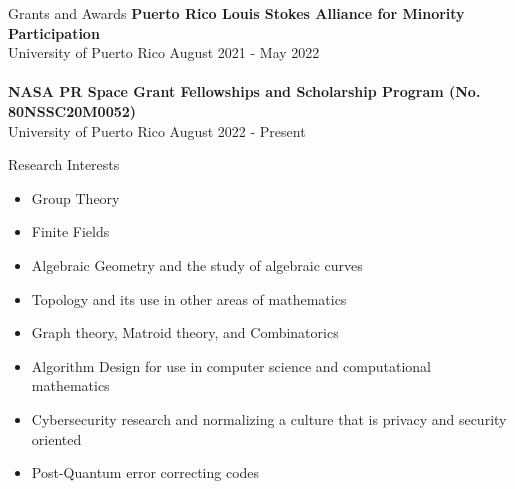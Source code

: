 \documentclass{resume} %
\begin{document}
\begin{rSection}{Grants and Awards}
    \textbf{Puerto Rico Louis Stokes Alliance for Minority Participation} \\
    University of Puerto Rico \hfill{August 2021 - May 2022} \\\\
    \textbf{NASA PR Space Grant Fellowships and Scholarship Program (No.
    80NSSC20M0052)} \\
    University of Puerto Rico \hfill{August 2022 - Present}
\end{rSection}

\pagebreak

\begin{rSection}{Research Interests}
    \begin{multicols}{2}
    \begin{itemize}
        \item Group Theory

        \item Finite Fields

        \item Algebraic Geometry and the study of algebraic curves

        \item Topology and its use in other areas of mathematics

        \item Graph theory, Matroid theory, and Combinatorics

        \item Algorithm Design for use in computer science and computational
            mathematics

        \item Cybersecurity research and normalizing a culture that is privacy
            and security oriented

        \item Post-Quantum error correcting codes
    \end{itemize}
    \end{multicols}
\end{rSection}
\end{document}

